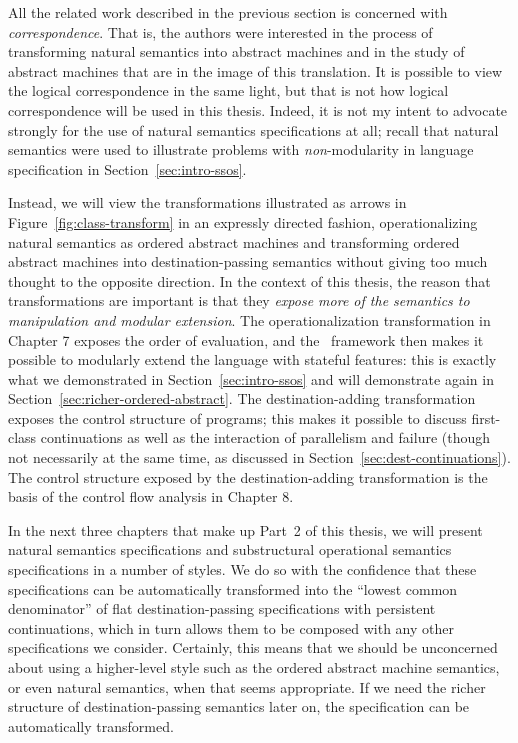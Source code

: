 All the related work described in the previous section is concerned with {\it
  correspondence}. That is, the authors were interested in the process
of transforming natural semantics into abstract machines and in the
study of abstract machines that are in the image of this
translation. It is possible to view the logical correspondence in the
same light, but that is not how logical correspondence will be used in
this thesis.  Indeed, it is not my intent to advocate strongly for the
use of natural semantics specifications at all; recall that natural
semantics were used to illustrate problems with {\it non}-modularity
in language specification in Section~\ref{sec:intro-ssos}.

Instead, we will view the transformations illustrated as arrows in
Figure~\ref{fig:class-transform} in an expressly directed fashion,
operationalizing natural semantics as ordered abstract machines and
transforming ordered abstract machines into destination-passing
semantics without giving too much thought to the opposite
direction. In the context of this thesis, the reason that
transformations are important is that they {\it expose more of the
  semantics to manipulation and modular extension}.  The
operationalization transformation in Chapter 7 exposes the order of
evaluation, and the \sls~framework then makes it possible to modularly
extend the language with stateful features: this is exactly what we
demonstrated in Section~\ref{sec:intro-ssos} and will
demonstrate again in Section~\ref{sec:richer-ordered-abstract}.  The
destination-adding transformation exposes the control structure of
programs; this makes it possible to discuss first-class continuations
as well as the interaction of parallelism and failure (though not
necessarily at the same time, as discussed in
Section~\ref{sec:dest-continuations}).  The control structure exposed
by the destination-adding transformation is the basis of the control
flow analysis in Chapter 8.

In the next three chapters that make up Part~2 of this thesis, we will
present natural semantics specifications and substructural operational
semantics specifications in a number of styles. We do so with the
confidence that these specifications can be automatically transformed
into the ``lowest common denominator'' of flat destination-passing
specifications with persistent continuations, which in turn allows
them to be composed with any other specifications we
consider. Certainly, this means that we should be unconcerned about
using a higher-level style such as the ordered abstract machine
semantics, or even natural semantics, when that seems appropriate. If
we need the richer structure of destination-passing semantics later
on, the specification can be automatically transformed. 

